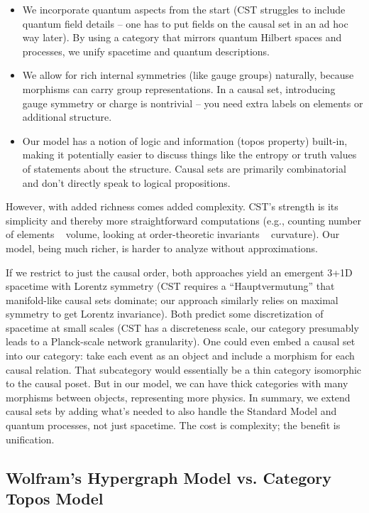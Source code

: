 \documentclass{article}
\begin{document}
\begin{itemize}
\item We incorporate quantum aspects from the start (CST struggles to include quantum field details – one has to put fields on the causal set in an ad hoc way later). By using a category that mirrors quantum Hilbert spaces and processes\cite{abramsky2009}, we unify spacetime and quantum descriptions.
\item We allow for rich internal symmetries (like gauge groups) naturally, because morphisms can carry group representations. In a causal set, introducing gauge symmetry or charge is nontrivial – you need extra labels on elements or additional structure.
\item Our model has a notion of logic and information (topos property) built-in, making it potentially easier to discuss things like the entropy or truth values of statements about the structure. Causal sets are primarily combinatorial and don’t directly speak to logical propositions.
\end{itemize}

However, with added richness comes added complexity. CST’s strength is its simplicity and thereby more straightforward computations (e.g., counting number of elements ~ volume, looking at order-theoretic invariants ~ curvature). Our model, being much richer, is harder to analyze without approximations.

If we restrict to just the causal order, both approaches yield an emergent 3+1D spacetime with Lorentz symmetry (CST requires a “Hauptvermutung” that manifold-like causal sets dominate; our approach similarly relies on maximal symmetry to get Lorentz invariance). Both predict some discretization of spacetime at small scales (CST has a discreteness scale, our category presumably leads to a Planck-scale network granularity). One could even embed a causal set into our category: take each event as an object and include a morphism for each causal relation. That subcategory would essentially be a thin category isomorphic to the causal poset. But in our model, we can have thick categories with many morphisms between objects, representing more physics. In summary, we extend causal sets by adding what’s needed to also handle the Standard Model and quantum processes, not just spacetime. The cost is complexity; the benefit is unification.

\subsection{Wolfram’s Hypergraph Model vs. Category Topos Model}
\end{document}
